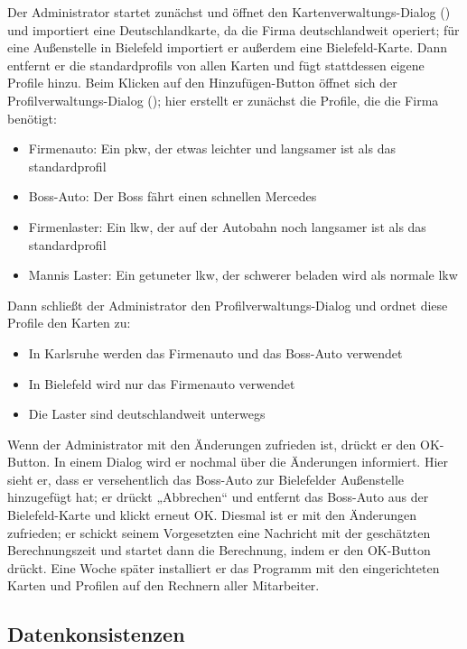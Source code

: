 \documentclass[a4paper, 11pt]{article}
\begin{document}
\begin{description}
Der Administrator startet zunächst \routeKIT und öffnet den Kartenverwaltungs-Dialog () und importiert eine Deutschlandkarte, da die Firma deutschlandweit operiert; für eine Außenstelle in Bielefeld importiert er außerdem eine Bie\-le\-feld-Kar\-te. Dann entfernt er die \glspl{standardprofil} von allen Karten und fügt stattdessen eigene Profile hinzu. Beim Klicken auf den Hinzufügen-Button öffnet sich der Profilverwaltungs-Dialog (); hier erstellt er zunächst die Profile, die die Firma benötigt:
\begin{itemize}
\item Firmenauto: Ein \gls{pkw}, der etwas leichter und langsamer ist als das \gls{standardprofil}
\item Boss-Auto: Der Boss fährt einen schnellen Mercedes
\item Firmenlaster: Ein \gls{lkw}, der auf der Autobahn noch langsamer ist als das \gls{standardprofil}
\item Mannis Laster: Ein getuneter \gls{lkw}, der schwerer beladen wird als normale \gls{lkw}
\end{itemize}
Dann schließt der Administrator den Profilverwaltungs-Dialog und ordnet diese Profile den Karten zu:
\begin{itemize}
\item In Karlsruhe werden das Firmenauto und das Boss-Auto verwendet
\item In Bielefeld wird nur das Firmenauto verwendet
\item Die Laster sind deutschlandweit unterwegs
\end{itemize}
Wenn der Administrator mit den Änderungen zufrieden ist, drückt er den OK-Button. In einem Dialog wird er nochmal über die Änderungen informiert. Hier sieht er, dass er versehentlich das Boss-Auto zur Bielefelder Außenstelle hinzugefügt hat; er drückt „Abbrechen“ und entfernt das Boss-Auto aus der Bielefeld-Karte und klickt erneut OK. Diesmal ist er mit den Änderungen zufrieden; er schickt seinem Vorgesetzten eine Nachricht mit der geschätzten Berechnungszeit und startet dann die Berechnung, indem er den OK-Button drückt. Eine Woche später installiert er das Programm mit den eingerichteten Karten und Profilen auf den Rechnern aller Mitarbeiter.

\end{description}

\subsection{Datenkonsistenzen}
\end{document}
